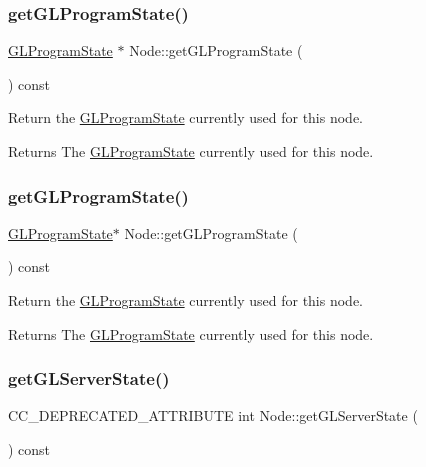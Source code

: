 \subsubsection{\texorpdfstring{get\+G\+L\+Program\+State()}{getGLProgramState()}\hspace{0.1cm}{\footnotesize\ttfamily [1/2]}}
{\footnotesize\ttfamily \hyperlink{classGLProgramState}{G\+L\+Program\+State} $\ast$ Node\+::get\+G\+L\+Program\+State (\begin{DoxyParamCaption}{ }\end{DoxyParamCaption}) const}

Return the \hyperlink{classGLProgramState}{G\+L\+Program\+State} currently used for this node.

\begin{DoxyReturn}{Returns}
The \hyperlink{classGLProgramState}{G\+L\+Program\+State} currently used for this node. 
\end{DoxyReturn}
\mbox{\label{classNode_a664a40747cd6cb1410a4521b2dca3bdc}} 
\subsubsection{\texorpdfstring{get\+G\+L\+Program\+State()}{getGLProgramState()}\hspace{0.1cm}{\footnotesize\ttfamily [2/2]}}
{\footnotesize\ttfamily \hyperlink{classGLProgramState}{G\+L\+Program\+State}$\ast$ Node\+::get\+G\+L\+Program\+State (\begin{DoxyParamCaption}{ }\end{DoxyParamCaption}) const}

Return the \hyperlink{classGLProgramState}{G\+L\+Program\+State} currently used for this node.

\begin{DoxyReturn}{Returns}
The \hyperlink{classGLProgramState}{G\+L\+Program\+State} currently used for this node. 
\end{DoxyReturn}
\mbox{\label{classNode_a4817ce95fa64827e8a58645e5b5854ae}} 
\subsubsection{\texorpdfstring{get\+G\+L\+Server\+State()}{getGLServerState()}\hspace{0.1cm}{\footnotesize\ttfamily [1/2]}}
{\footnotesize\ttfamily C\+C\+\_\+\+D\+E\+P\+R\+E\+C\+A\+T\+E\+D\+\_\+\+A\+T\+T\+R\+I\+B\+U\+TE int Node\+::get\+G\+L\+Server\+State (\begin{DoxyParamCaption}{ }\end{DoxyParamCaption}) const\hspace{0.3cm}{\ttfamily [inline]}}

